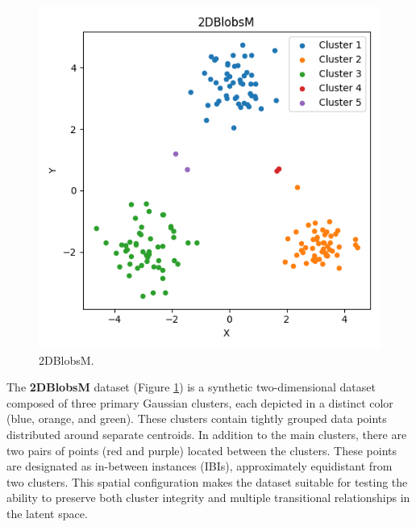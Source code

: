 \begin{figure}
    \centering
    \includegraphics[width=\myimgwidth]{images/datasets/2DBlobsM.png}
    \caption{2DBlobsM.}
    \label{fig:2DBlobsM}
\end{figure}
The \textbf{2DBlobsM} dataset (Figure \ref{fig:2DBlobsM}) is a synthetic two-dimensional dataset composed of three primary Gaussian clusters, each depicted in a distinct color (blue, orange, and green). These clusters contain tightly grouped data points distributed around separate centroids. In addition to the main clusters, there are two pairs of points (red and purple) located between the clusters. These points are designated as in-between instances (IBIs), approximately equidistant from two clusters. This spatial configuration makes the dataset suitable for testing the ability to preserve both cluster integrity and multiple transitional relationships in the latent space.
\newline
\newpage

